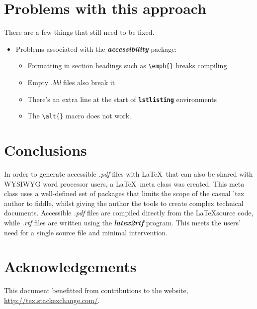 \documentclass[12pt,letterpaper]{article}
\newcommand{\fn}[1]{\emph{#1}}
\newcommand{\packagename}[1]{\textbf{\emph{#1}}}
\newcommand{\envname}[1]{\textbf{\texttt{#1}}}
\begin{document}
\section{Problems with this approach}
There are a few things that still need to be fixed.

\begin{itemize}
\item Problems associated with the \packagename{accessibility} package:
\begin{itemize}
\item Formatting in section headings such as \verb+\emph{}+ breaks compiling
\item Empty \fn{.bbl} files also break it
\item There's an extra line at the start of \envname{lstlisting} environments
\item The \verb+\alt{}+ macro does not work.
\end{itemize}
\end{itemize}

\section{Conclusions}
In order to generate accessible \fn{.pdf} files with \LaTeX\ that can also be shared with WYSIWYG word processor users, a \LaTeX\ meta class was created. This meta class uses a well-defined set of packages that limits the scope of the casual 'tex author to fiddle, whilst giving the author the tools to create complex technical documents. Accessible \fn{.pdf} files are compiled directly from the \LaTeX source code, while \fn{.rtf} files are written using the \packagename{latex2rtf} program. This meets the users' need for a single source file and minimal intervention.

\section*{Acknowledgements}
This document benefitted from contributions to the website, \url{http://tex.stackexchange.com/}.
\end{document}
